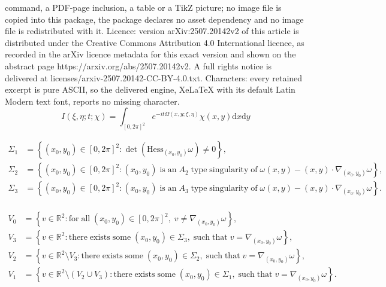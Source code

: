 \documentclass[10pt,a4paper]{amsart}
\def\d{\mathrm{d}}
\newcommand{\R}{\mathbb{R}}
\begin{document}
command, a PDF-page inclusion, a table or a TikZ picture; no image file is copied into this package, the package declares no asset dependency and no image file is redistributed with it. Licence: version arXiv:2507.20142v2 of this article is distributed under the Creative Commons Attribution 4.0 International licence, as recorded in the arXiv licence metadata for this exact version and shown on the abstract page https://arxiv.org/abs/2507.20142v2. A full rights notice is delivered at licenses/arxiv-2507.20142-CC-BY-4.0.txt. Characters: every retained excerpt is pure ASCII, so the delivered engine, XeLaTeX with its default Latin Modern text font, reports no missing character.
\begin{equation}\label{def: General oscillatory integral on the torus}
    I\left(\xi,\eta;t;\chi\right)=\int_{\left[0,2\pi\right]^{2}}e^{-it\Omega\left(x,y;\xi,\eta\right)}\chi\left(x,y\right)\d x\d y
\end{equation}

\begin{equation}\label{def: Sigmai}
	\begin{aligned}
		\Sigma_{1}&=\left\{\left(x_0,y_0\right)\in\left[0,2\pi\right]^{2}:\det\left(\mathrm{Hess}_{\left(x_0,y_0\right)}\omega\right)\neq0\right\},\\
		\Sigma_{2}&=\left\{\left(x_0,y_0\right)\in\left[0,2\pi\right]^{2}:\left(x_0,y_0\right)\;\mathrm{is\;an}\;A_{2}\;\mathrm{type\;singularity\;of}\;\omega\left(x,y\right)-\left(x,y\right)\cdot\nabla_{\left(x_0,y_0\right)}\omega\right\},\\
		\Sigma_{3}&=\left\{\left(x_0,y_0\right)\in\left[0,2\pi\right]^{2}:\left(x_0,y_0\right)\;\mathrm{is\;an}\;A_{3}\;\mathrm{type\;singularity\;of}\;\omega\left(x,y\right)-\left(x,y\right)\cdot\nabla_{\left(x_0,y_0\right)}\omega\right\}.\\
	\end{aligned}
\end{equation}

\begin{equation}\label{def: Vi}
	\begin{aligned}
        V_{0}&=\left\{v\in\R^{2}:\mathrm{for\;all}\;\left(x_{0},y_{0}\right)\in\left[0,2\pi\right]^{2},\;v\neq\nabla_{\left(x_{0},y_{0}\right)}\omega\right\},\\
		V_{3}&=\left\{v\in\R^{2}:\mathrm{there\;exists\;some}\;\left(x_{0},y_{0}\right)\in \Sigma_{3},\;\mathrm{such\;that}\;v=\nabla_{\left(x_{0},y_{0}\right)}\omega\right\},\\
        V_{2}&=\left\{v\in\R^{2}\setminus V_{3}:\mathrm{there\;exists\;some}\;\left(x_{0},y_{0}\right)\in \Sigma_{2},\;\mathrm{such\;that}\;v=\nabla_{\left(x_{0},y_{0}\right)}\omega\right\},\\
        V_{1}&=\left\{v\in\R^{2}\setminus \left(V_{2}\cup V_{3}\right):\mathrm{there\;exists\;some}\;\left(x_{0},y_{0}\right)\in \Sigma_{1},\;\mathrm{such\;that}\;v=\nabla_{\left(x_{0},y_{0}\right)}\omega\right\}.\\
	\end{aligned}
\end{equation}
\end{document}
